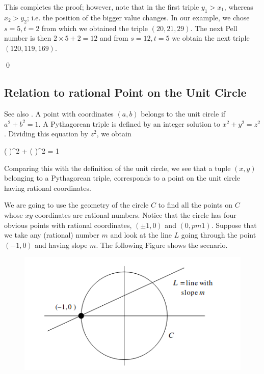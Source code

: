 This completes the proof; however, note that in the first triple $y_1 > x_1$, whereas $x_2 > y_2$; i.e. the position of the bigger value changes. In our example, we chose $s = 5, t=2$ from which we obtained the triple $(20, 21, 29)$. The next Pell number is then $2 \times 5 + 2 = 12$ and from $s = 12, t = 5$ we obtain the next triple $(120, 119, 169)$. 

\qed

\subsection{Relation to rational Point on the Unit Circle}

See also \cite{Silverman2014}. A point with coordinates $(a,b)$ belongs to the unit circle if $a^2 + b^2 = 1$. A Pythagorean triple is defined by an integer solution to $x^2 + y^2 = z^2$. Dividing this equation by $z^2$, we obtain

\bee
\left(  \right)^2 + \left(  \right)^2 = 1
\eee

Comparing this with the definition of the unit circle, we see that a tuple $(x,y)$ belonging to a Pythagorean triple, corresponds to a point on the unit circle having rational coordinates.

We are going to use the geometry of the circle $C$ to find all the points on $C$ whose $xy$-coordinates are rational numbers. Notice that the circle has four obvious points with rational coordinates, $(\pm 1, 0)$ and $(0, pm 1)$. Suppose that we take any (rational) number $m$ and look at the line $L$ going through the point $(-1, 0)$ and having slope $m$. The following Figure shows the scenario.

\begin{figure}[H]
    \centering
    \includegraphics[scale=0.75]{images/2023_04_12_circle_1.png}
\end{figure}

